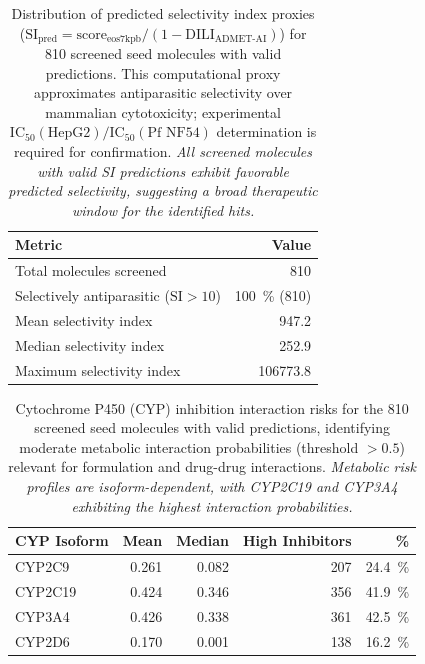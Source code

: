 \documentclass[journal=jcisd8,manuscript=suppinfo]{achemso}
\begin{document}
\begin{table}[htbp]
\centering
\caption{Distribution of predicted selectivity index proxies ($\text{SI}_{\text{pred}} = \text{score}_{\text{eos7kpb}} / (1 - \text{DILI}_{\text{ADMET-AI}})$) for \num{810} screened seed molecules with valid predictions. This computational proxy approximates antiparasitic selectivity over mammalian cytotoxicity; experimental $\text{IC}_{50}(\text{HepG2}) / \text{IC}_{50}(\text{Pf NF54})$ determination is required for confirmation. \textit{All screened molecules with valid SI predictions exhibit favorable predicted selectivity, suggesting a broad therapeutic window for the identified hits.}}
\label{tab:selectivity}
\begin{tabular}{@{}l r@{}}
\toprule
\textbf{Metric} & \textbf{Value} \\
\midrule
Total molecules screened & \num{810} \\
Selectively antiparasitic ($\text{SI} > \num{10}$) & \qty{100}{\percent} (\num{810}) \\
Mean selectivity index & \num{947.2} \\
Median selectivity index & \num{252.9} \\
Maximum selectivity index & \num{106773.8} \\
\bottomrule
\end{tabular}
\end{table}

\begin{table}[htbp]
\centering
\caption{Cytochrome P450 (CYP) inhibition interaction risks for the \num{810} screened seed molecules with valid predictions, identifying moderate metabolic interaction probabilities (threshold $> \num{0.5}$) relevant for formulation and drug-drug interactions. \textit{Metabolic risk profiles are isoform-dependent, with CYP2C19 and CYP3A4 exhibiting the highest interaction probabilities.}}
\label{tab:cyp450}
\begin{tabular}{@{}l r r r r@{}}
\toprule
\textbf{CYP Isoform} & \textbf{Mean} & \textbf{Median} & \textbf{High Inhibitors} & \textbf{\unit{\percent}} \\
\midrule
CYP2C9 & \num{0.261} & \num{0.082} & \num{207} & \qty{24.4}{\percent} \\
CYP2C19 & \num{0.424} & \num{0.346} & \num{356} & \qty{41.9}{\percent} \\
CYP3A4 & \num{0.426} & \num{0.338} & \num{361} & \qty{42.5}{\percent} \\
CYP2D6 & \num{0.170} & \num{0.001} & \num{138} & \qty{16.2}{\percent} \\
\bottomrule
\end{tabular}
\end{table}
\end{document}
